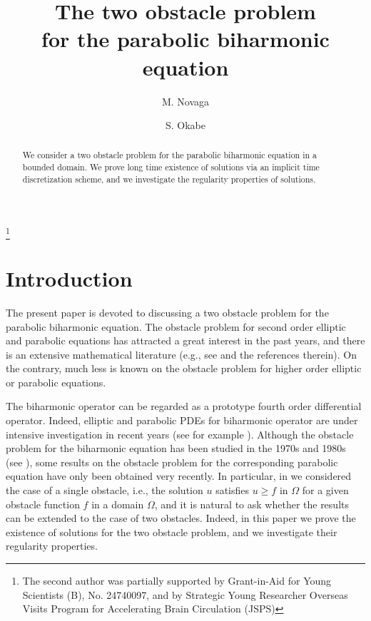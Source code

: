 \documentclass[12pt]{amsart}
\title[The two obstacle problem for the parabolic biharmonic equation]{The two obstacle problem \\ for the parabolic biharmonic equation}
\author{M. Novaga}
\author{S. Okabe}
\begin{document}
\begin{abstract}
We consider a two obstacle problem for the parabolic biharmonic equation 
in a bounded domain. 
We prove long time existence of solutions via an implicit time discretization 
scheme, and we investigate the regularity properties of solutions. 
\end{abstract} 
\thanks{The second author was partially supported by Grant-in-Aid for Young Scientists (B), No. 24740097, 
and by Strategic Young Researcher Overseas Visits Program for Accelerating Brain Circulation (JSPS)}

\maketitle

\section{Introduction}
The present paper is devoted to discussing a two obstacle problem 
for the parabolic biharmonic equation. 
The obstacle problem for second order elliptic and parabolic equations 
has attracted a great interest in the past years, and there is
an extensive mathematical literature 
(e.g., see \cite{C} and the references therein). On the contrary, 
much less is known on
the obstacle problem for higher order elliptic or parabolic equations. 

The biharmonic operator can be regarded as a prototype 
fourth order differential operator. 
Indeed, elliptic and parabolic PDEs for biharmonic operator 
are under intensive investigation in recent years
(see for example \cite{Ba, CM, CR, G, GG, GGS, GH, GP}).  
Although the obstacle problem for the biharmonic equation has been studied in the 1970s and 1980s (see \cite{BGT, BS, CF, CFT, F1,Schi}), 
some results on the obstacle problem for the corresponding parabolic equation 
have only been obtained very recently.
In particular, in \cite{NO} we considered the case of a single obstacle, i.e., the solution $u$ satisfies $u \ge f$ in $\Omega$ 
for a given obstacle function $f$ in a domain $\Omega$, and 
it is natural to ask whether the results can be extended to the case of two obstacles. 
Indeed, in this paper we prove the existence of solutions for the two obstacle problem,
and we investigate their regularity properties. 
\end{document}

